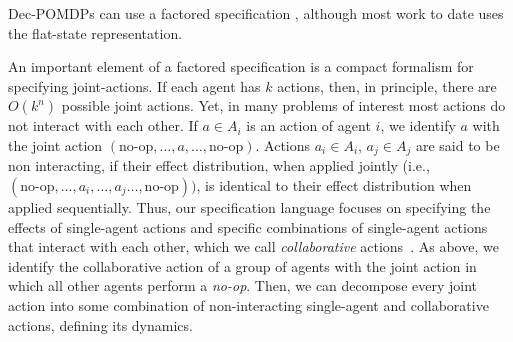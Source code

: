 \documentclass[runningheads]{llncs}
\newcommand{\citep}{\cite}
\newcommand{\commentout}[1]{}
\begin{document}
Dec-POMDPs can use a factored specification \citep{FDECPOMDP}, although most work to date uses the flat-state representation.
%
\commentout{
\begin{example}
We use the following 2 cell box-pushing example as our running example. There are two cells: \emph{L}(left) and \emph{R}(right).
There are two agents  $A_1$ and $A_2$. 
$A_1$ is at \emph{L} and $A_2$ is at \emph{R}.
There are two boxes:$B_1$, and \emph{Box2}, starting at \emph{R} and \emph{L} respectively. See top of Figure~1.
The goal is to swap the boxes: $B_1$ needs to reach \emph{L}, while $B_2$need to reach \emph{R}.
Agents can move, push a box, or sense their current cell for a box. Move and Push can be done in any direction. 
The state is composed of 4 state variables: the location of each box -- $(X_{B1}, X_{B2})$ -- and the location of each agent -- $(X_{A1}, X_{A2})$. In addition, there are two observation variables -- $(\omega_1, \omega_2)$, one for each agent.
\end{example}
}
%
An important element of a factored specification is a compact formalism for specifying joint-actions. If each
agent has $k$ actions, then, in principle, there are $O(k^n)$ possible joint actions. 
%
Yet, in many problems of interest most actions do not interact with each other. If $a\in A_i$ is an action of agent $i$, we identify $a$ with the joint action $(\mbox{no-op},\ldots, a,\ldots,\mbox{no-op})$.
Actions $a_i\in A_i$, $a_j \in A_j$ are said to be non interacting, if their effect distribution, when applied jointly (i.e., $(\mbox{no-op},\ldots,a_i,
\ldots, a_j\ldots,\mbox{no-op}))$, 
is identical to their effect distribution when applied sequentially.
Thus, our specification language focuses on specifying
the effects of single-agent actions and specific
combinations of single-agent actions that interact with each other, which we call {\em collaborative} actions~\citep{CPOR}.
As above, we identify the collaborative action of a group of agents with the joint action in which all other agents perform a {\em no-op}. Then,
we can decompose every joint action into some combination of non-interacting single-agent and collaborative actions, defining its dynamics.
\end{document}
